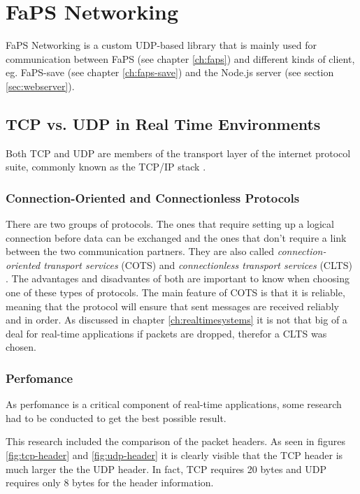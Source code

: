 \chapter{FaPS Networking}
\label{ch:faps-networking}

\author{Nico Kratky}
%
FaPS Networking is a custom UDP-based library that is mainly used for communication between FaPS (see chapter \vref{ch:faps}) and different kinds of client, eg. FaPS-save (see chapter \vref{ch:faps-save}) and the Node.js server (see
section \vref{sec:webserver}).

\section{TCP vs. UDP in Real Time Environments}

Both TCP and UDP are members of the transport layer of the internet protocol suite, commonly known as the TCP/IP stack \autocite{rfc1122}.

\subsection{Connection-Oriented and Connectionless Protocols}

There are two groups of protocols. The ones that require setting up a logical connection before data can be exchanged and the ones that don't require a link between the two communication partners. They are also called
\textit{connection-oriented transport services} (COTS) and \textit{connectionless transport services} (CLTS) \autocite{connectionbased-vs-connectionless}. The advantages and disadvantes of both are important to know when choosing one of these types of protocols.
The main feature of COTS is that it is reliable, meaning that the protocol will ensure that sent messages are received reliably and in order. As discussed in chapter \vref{ch:realtimesystems} it is not that big of a deal for
real-time applications if packets are dropped, therefor a CLTS was chosen.

\subsection{Perfomance}

As perfomance is a critical component of real-time applications, some research had to be conducted to get the best possible result.

This research included the comparison of the packet headers. As seen in figures \vref{fig:tcp-header} and \vref{fig:udp-header} it is clearly visible that the TCP header is much larger the the UDP header. In fact, TCP requires 20 bytes and UDP requires only 8 bytes for the header information.


